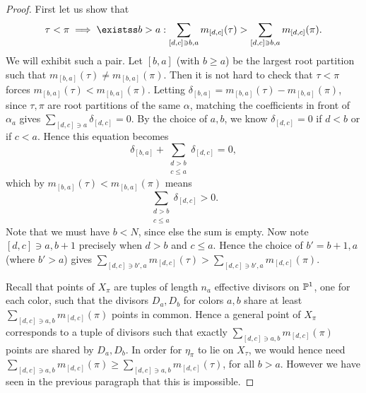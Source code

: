 \documentclass[11pt,reqno]{amsart}
\begin{document}
\begin{proof}
    First let us show that
    \[\tau<\pi\implies\existss b>a: \sum_{[d,c]\ni b,a}m_{[d,c]}(\tau)>\sum_{[d,c]\ni b,a}m_{[d,c]}(\pi).\] 
    We will exhibit such a pair. Let $[b,a]$ (with $b\ge a$) be the largest root partition such that $m_{[b,a]}(\tau)\neq m_{[b,a]}(\pi)$. Then it is not hard to check that $\tau<\pi$ forces $m_{[b,a]}(\tau)<m_{[b,a]}(\pi)$. Letting $\delta_{[b,a]}=m_{[b,a]}(\tau)-m_{[b,a]}(\pi)$, since $\tau,\pi$ are root partitions of the same $\alpha$, matching the coefficients in front of $\alpha_a$ gives $\sum_{[d,c]\ni a}\delta_{[d,c]}=0$. By the choice of $a,b$, we know $\delta_{[d,c]}=0$ if $d<b$ or if $c<a$. Hence this equation becomes
    \[\delta_{[b,a]}+\sum_{\substack{d>b\\c\le a}}\delta_{[d,c]}=0,\]
    which by $m_{[b,a]}(\tau)<m_{[b,a]}(\pi)$ means
    \[\sum_{\substack{d>b\\c\le a}} \delta_{[d,c]}>0.\]
    Note that we must have $b<N$, since else the sum is empty. Now note $[d,c]\ni a,b+1$ precisely when $d>b$ and $c\le a$. Hence the choice of $b'=b+1,a$ (where $b'>a$) gives $\sum_{[d,c]\ni b',a}m_{[d,c]}(\tau)>\sum_{[d,c]\ni b',a}m_{[d,c]}(\pi)$.

    Recall that points of $X_\pi$ are tuples of length $n_a$ effective divisors on $\mathbb P^1$, one for each color, such that the divisors $D_a,D_b$ for colors $a,b$ share at least $\sum_{[d,c]\ni a,b}m_{[d,c]}(\pi)$ points in common. Hence a general point of $X_\pi$ corresponds to a tuple of divisors such that exactly $\sum_{[d,c]\ni a,b}m_{[d,c]}(\pi)$ points are shared by $D_a,D_b$. In order for $\eta_\pi$ to lie on $X_\tau$, we would hence need $\sum_{[d,c]\ni a,b}m_{[d,c]}(\pi)\ge \sum_{[d,c]\ni a,b}m_{[d,c]}(\tau)$, for all $b>a$. However we have seen in the previous paragraph that this is impossible.



\end{proof}
\end{document}
